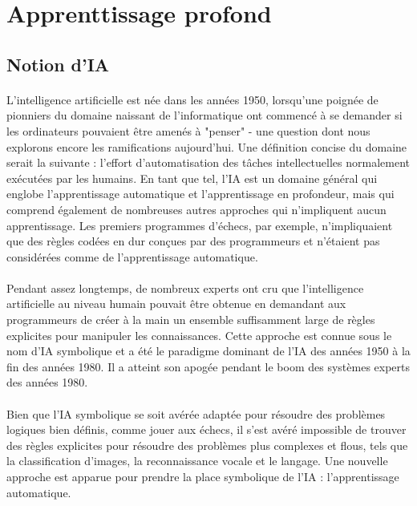\section{Apprenttissage profond}
\subsection{Notion d’IA} 
\paragraph{}L'intelligence artificielle est née dans les années 1950, lorsqu'une poignée de pionniers du domaine naissant de l'informatique ont commencé à se demander si les ordinateurs pouvaient être amenés à "penser" - une question dont nous explorons encore les ramifications aujourd'hui. Une définition concise du domaine serait la suivante : l'effort d'automatisation des tâches intellectuelles normalement exécutées par les humains. En tant que tel, l'IA est un domaine général qui englobe l'apprentissage automatique et l'apprentissage en profondeur, mais qui comprend également de nombreuses autres approches qui n'impliquent aucun apprentissage. Les premiers programmes d'échecs, par exemple, n'impliquaient que des règles codées en dur conçues par des programmeurs et n'étaient pas considérées comme de l'apprentissage automatique. 
\paragraph{}Pendant assez longtemps, de nombreux experts ont cru que l'intelligence artificielle au niveau humain pouvait être obtenue en demandant aux programmeurs de créer à la main un ensemble suffisamment large de règles explicites pour manipuler les connaissances. Cette approche est connue sous le nom d'IA symbolique et a été le paradigme dominant de l'IA des années 1950 à la fin des années 1980. Il a atteint son apogée pendant le boom des systèmes experts des années 1980.
\paragraph{}Bien que l'IA symbolique se soit avérée adaptée pour résoudre des problèmes logiques bien définis, comme jouer aux échecs, il s'est avéré impossible de trouver des règles explicites pour résoudre des problèmes plus complexes et flous, tels que la classification d'images, la reconnaissance vocale et le langage. Une nouvelle approche est apparue pour prendre la place symbolique de l'IA : l'apprentissage automatique.


